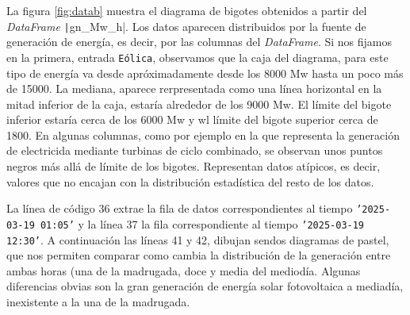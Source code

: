 \begin{paracol}{2}
La figura \ref{fig:datab} muestra el diagrama de bigotes obtenidos a partir del \emph{DataFrame} \texttt|gn_Mw_h|. Los datos aparecen distribuidos por la fuente de generación de energía, es decir, por las columnas del \emph{DataFrame}. Si nos fijamos en la primera, entrada \texttt{Eólica}, observamos que la caja del diagrama, para este tipo de energía va desde apróximadamente desde los 8000 Mw hasta un poco más de 15000. La mediana, aparece rerpresentada como una línea horizontal en la mitad inferior de la caja, estaría alrededor de los 9000 Mw. El límite del bigote inferior estaría cerca de los 6000 Mw y wl límite del bigote superior cerca de 1800. En algunas columnas, como por ejemplo en la que representa la generación de electricida mediante turbinas de ciclo combinado, se observan unos puntos negros más allá de límite de los bigotes. Representan datos atípicos, es decir, valores que no encajan con la distribución estadística del resto de los datos.
\end{paracol}


\begin{paracol}{2}
La línea de código 36 extrae la fila de datos correspondientes al tiempo \texttt{'2025-03-19 01:05'} y la línea 37 la fila correspondiente al tiempo \texttt{'2025-03-19 12:30'}. A continuación las líneas 41 y 42, dibujan sendos diagramas de pastel, que nos permiten comparar como cambia la distribución de la generación entre ambas horas (una de la madrugada, doce y media del mediodía. Algunas diferencias obvias son la gran generación de energía solar fotovoltaica a mediadía, inexistente a la una de la madrugada.  
\end{paracol}




